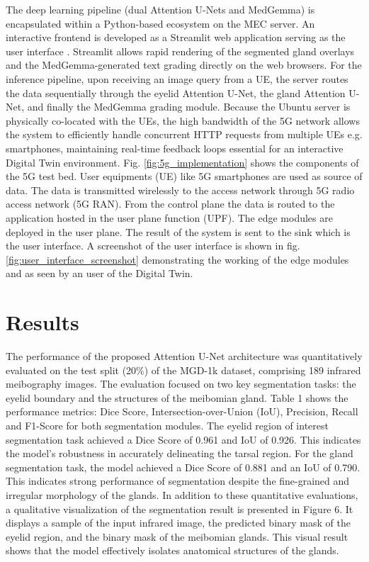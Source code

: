 \documentclass{article}
\begin{document}
The deep learning pipeline (dual Attention U-Nets and MedGemma) is encapsulated within a Python-based ecosystem on the MEC server.
An interactive frontend is developed as a Streamlit web application serving as the user interface \cite{streamlit}. Streamlit allows rapid rendering of the segmented gland overlays and the MedGemma-generated text grading directly on the web browsers. For the inference pipeline, upon receiving an image query from a UE, the server routes the data sequentially through the eyelid Attention U-Net, the gland Attention U-Net, and finally the MedGemma grading module. Because the Ubuntu server is physically co-located with the UEs, the high bandwidth of the 5G network allows the system to efficiently handle concurrent HTTP requests from multiple UEs e.g. smartphones, maintaining real-time feedback loops essential for an interactive Digital Twin environment. Fig. \ref{fig:5g_implementation} shows the components of the 5G test bed. User equipments (UE) like 5G smartphones are used as source of data. The data is transmitted wirelessly to the access network through 5G radio access network (5G RAN). From the control plane the data is routed to the application hosted in the user plane function (UPF). The edge modules are deployed in the user plane. The result of the system is sent to the sink which is the user interface. A screenshot of the user interface is shown in fig. \ref{fig:user_interface_screenshot} demonstrating the working of the edge modules and as seen by an user of the Digital Twin.

\section{Results}
The performance of the proposed Attention U-Net architecture was quantitatively evaluated on the test split (20\%) of the MGD-1k dataset, comprising 189 infrared meibography images. The evaluation focused on two key segmentation tasks: the eyelid boundary and the structures of the   meibomian gland. Table 1 shows the performance metrics: Dice Score, Intersection-over-Union (IoU), Precision, Recall and F1-Score for both segmentation modules. The eyelid region of interest segmentation task achieved a Dice Score of 0.961 and IoU of 0.926. This indicates the model’s robustness in accurately delineating the tarsal region. For the gland segmentation task, the model achieved a Dice Score of 0.881 and an IoU of 0.790. This indicates strong performance of segmentation despite the fine-grained and irregular morphology of the glands. In addition to these quantitative evaluations, a qualitative visualization of the segmentation result is presented in Figure 6. It displays a sample of the input infrared image, the predicted binary mask of the eyelid region, and the binary mask of the meibomian glands. This visual result shows that the model effectively isolates anatomical structures of the glands.
\end{document}
